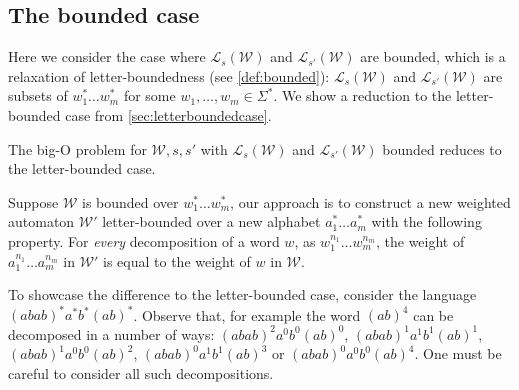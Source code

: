 \documentclass[10pt,a4paper]{amsart}
\numberwithin{equation}{section}
\theoremstyle{plain}
\theoremstyle{definition}
\theoremstyle{remark}
\newcommand\lng[2]{\mathcal{L}_{#1}(#2)}
\newcommand\wa{\mathcal{W}}
\begin{document}
\subsection{The bounded case}
\label{sec:boundedtoletterbounded}

Here we consider the case where $\lng{s}{\wa}$ and $\lng{s'}{\wa}$ are bounded, which is a relaxation of letter-boundedness (see \cref{def:bounded}): $\lng{s}{\wa}$ and $\lng{s'}{\wa}$ are subsets of $w_1^*\dots w_m^*$ for some $w_1,\dots,w_m\in\Sigma^*$. We show a reduction to the letter-bounded case from \cref{sec:letterboundedcase}.

\begin{lem}\label{lem:btolb}
The big-O problem for $\wa, s, s'$ with $\lng{s}{\wa}$ and $\lng{s'}{\wa}$ bounded reduces to the letter-bounded case.
\end{lem}

Suppose $\wa$ is bounded over $w_1^*\dots w_m^*$, our approach is to construct a new weighted automaton $\wa'$ letter-bounded over a new alphabet $a_1^*\dots a_m^*$  with the following property. For \textit{every} decomposition of a word $w$, as $w_1^{n_1}\dots w_m^{n_m}$, the weight of $a_1^{n_1}\dots a_m^{n_m}$ in $\wa'$ is equal to the weight of $w$ in $\wa$.

\begin{sloppypar}To showcase the difference to the letter-bounded case, consider the language $(abab)^*a^*b^*(ab)^*$. Observe that, for example the word $(ab)^4$ can be decomposed in a number of ways: $(abab)^2a^0b^0(ab)^0$, $(abab)^1a^1b^1(ab)^1$, $(abab)^1a^0b^0(ab)^2$, $(abab)^0a^1b^1(ab)^3$ or $(abab)^0a^0b^0(ab)^4$.
One must be careful to consider all such decompositions.\end{sloppypar}
\end{document}
